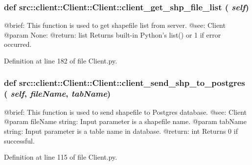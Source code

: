 \hypertarget{classsrc_1_1client_1_1Client_1_1Client_abaa61a1c95afdd49f337c42e53a124eb}{
\subsubsection[{client\_\-get\_\-shp\_\-file\_\-list}]{\setlength{\rightskip}{0pt plus 5cm}def src::client::Client::Client::client\_\-get\_\-shp\_\-file\_\-list ( {\em self})}}
\label{classsrc_1_1client_1_1Client_1_1Client_abaa61a1c95afdd49f337c42e53a124eb}
\begin{DoxyVerb}
@brief: This function is used to get shapefile list from server.
@see: Client
@param None:
@return: list Returns built-in Python's list() or 1 if error occurred. 
\end{DoxyVerb}
 

Definition at line 182 of file Client.py.

\hypertarget{classsrc_1_1client_1_1Client_1_1Client_ae7e99818087a1dad8bdac1ae5984d878}{
\subsubsection[{client\_\-send\_\-shp\_\-to\_\-postgres}]{\setlength{\rightskip}{0pt plus 5cm}def src::client::Client::Client::client\_\-send\_\-shp\_\-to\_\-postgres ( {\em self}, \/   {\em fileName}, \/   {\em tabName})}}
\label{classsrc_1_1client_1_1Client_1_1Client_ae7e99818087a1dad8bdac1ae5984d878}
\begin{DoxyVerb}
@brief: This function is used to send shapefile to Postgres database.
@see: Client
@param fileName string: Input parameter is a shapefile name.
@param tabName string: Input parameter is a table name in database.
@return: int Returns 0 if successful.  
\end{DoxyVerb}
 

Definition at line 115 of file Client.py.

